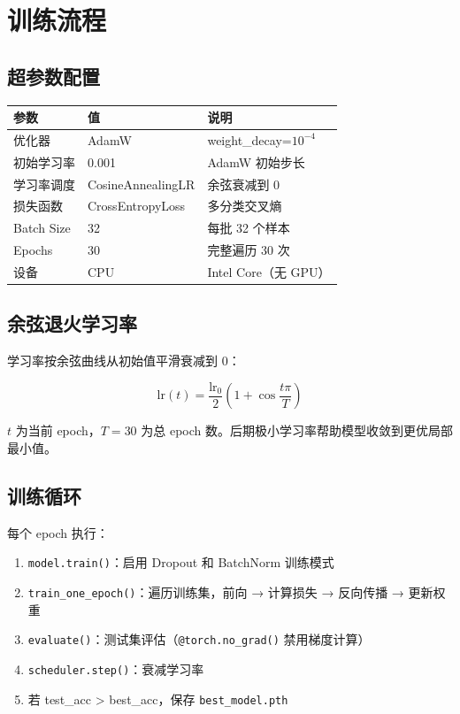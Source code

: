 \documentclass[12pt,a4paper]{ctexart}
\newcommand{\file}[1]{\texttt{#1}}
\newcommand{\code}[1]{\texttt{#1}}
\begin{document}
\section{训练流程}

\subsection{超参数配置}

\begin{table}[h]
\centering
\begin{tabular}{@{}lll@{}}
\toprule
\textbf{参数} & \textbf{值} & \textbf{说明} \\
\midrule
优化器          & AdamW             & weight\_decay=$10^{-4}$ \\
初始学习率       & 0.001            & AdamW 初始步长 \\
学习率调度       & CosineAnnealingLR & 余弦衰减到 0 \\
损失函数         & CrossEntropyLoss  & 多分类交叉熵 \\
Batch Size      & 32               & 每批 32 个样本 \\
Epochs          & 30               & 完整遍历 30 次 \\
设备            & CPU              & Intel Core（无 GPU）\\
\bottomrule
\end{tabular}
\end{table}

\subsection{余弦退火学习率}

学习率按余弦曲线从初始值平滑衰减到 0：

\[
\mathrm{lr}(t) = \frac{\mathrm{lr}_0}{2}\left(1 + \cos\frac{t\pi}{T}\right)
\]

$t$ 为当前 epoch，$T=30$ 为总 epoch 数。后期极小学习率帮助模型收敛到更优局部最小值。

\subsection{训练循环}

每个 epoch 执行：
\begin{enumerate}
    \item \code{model.train()}：启用 Dropout 和 BatchNorm 训练模式
    \item \code{train\_one\_epoch()}：遍历训练集，前向 → 计算损失 → 反向传播 → 更新权重
    \item \code{evaluate()}：测试集评估（\code{@torch.no\_grad()} 禁用梯度计算）
    \item \code{scheduler.step()}：衰减学习率
    \item 若 test\_acc > best\_acc，保存 \file{best\_model.pth}
\end{enumerate}
\end{document}
